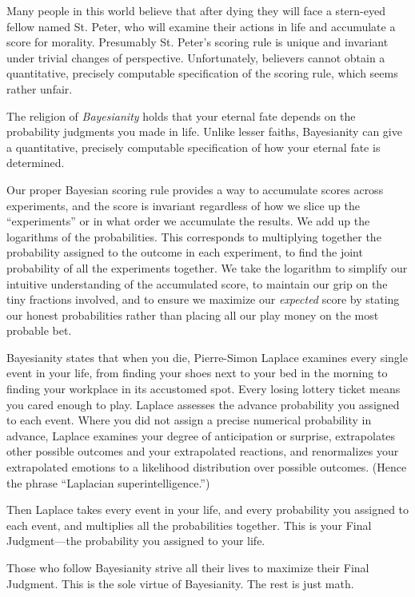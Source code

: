{
 Many people in this world believe that after dying they will face
a stern-eyed fellow named St. Peter, who will examine their actions in
life and accumulate a score for morality. Presumably St.
Peter's scoring rule is unique and invariant under
trivial changes of perspective. Unfortunately, believers cannot obtain
a quantitative, precisely computable specification of the scoring rule,
which seems rather unfair.}

{
 The religion of \textit{Bayesianity} holds that your eternal fate
depends on the probability judgments you made in life. Unlike lesser
faiths, Bayesianity can give a quantitative, precisely computable
specification of how your eternal fate is determined.}

{
 Our proper Bayesian scoring rule provides a way to accumulate
scores across experiments, and the score is invariant regardless of how
we slice up the ``experiments'' or
in what order we accumulate the results. We add up the logarithms of
the probabilities. This corresponds to multiplying together the
probability assigned to the outcome in each experiment, to find the
joint probability of all the experiments together. We take the
logarithm to simplify our intuitive understanding of the accumulated
score, to maintain our grip on the tiny fractions involved, and to
ensure we maximize our \textit{expected} score by stating our honest
probabilities rather than placing all our play money on the most
probable bet.}

{
 Bayesianity states that when you die, Pierre-Simon Laplace
examines every single event in your life, from finding your shoes next
to your bed in the morning to finding your workplace in its accustomed
spot. Every losing lottery ticket means you cared enough to play.
Laplace assesses the advance probability you assigned to each event.
Where you did not assign a precise numerical probability in advance,
Laplace examines your degree of anticipation or surprise, extrapolates
other possible outcomes and your extrapolated reactions, and
renormalizes your extrapolated emotions to a likelihood distribution
over possible outcomes. (Hence the phrase ``Laplacian
superintelligence.'')}

{
 Then Laplace takes every event in your life, and every probability
you assigned to each event, and multiplies all the probabilities
together. This is your Final Judgment---the probability you assigned to
your life.}

{
 Those who follow Bayesianity strive all their lives to maximize
their Final Judgment. This is the sole virtue of Bayesianity. The rest
is just math.}

